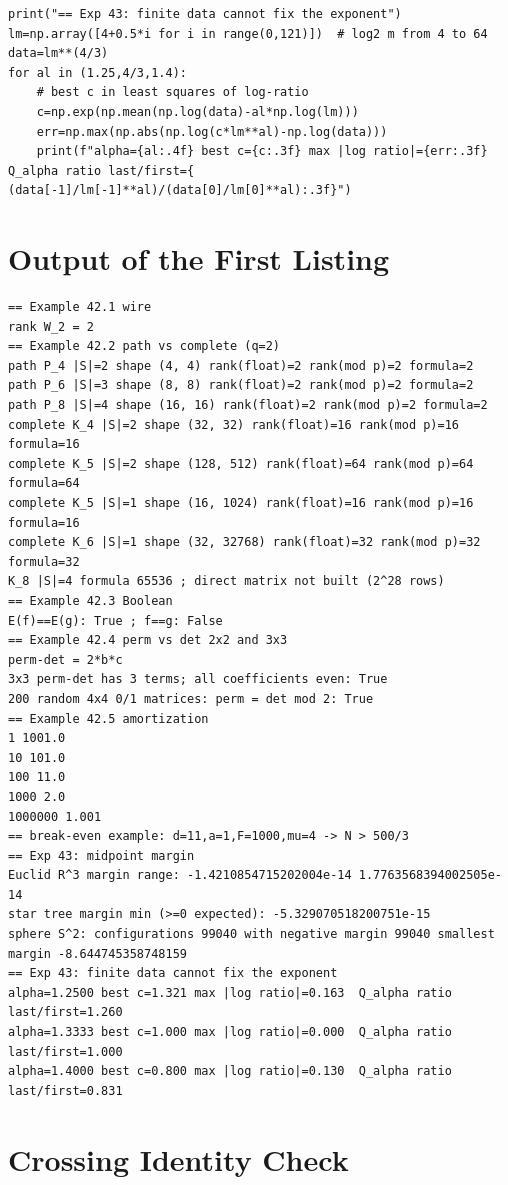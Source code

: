 \documentclass[11pt,letterpaper]{report}
\theoremstyle{plain}
\theoremstyle{definition}
\theoremstyle{remark}
\begin{document}
\begin{Verbatim}[fontsize=\scriptsize,breaklines=true,breakanywhere=true,frame=single]
print("== Exp 43: finite data cannot fix the exponent")
lm=np.array([4+0.5*i for i in range(0,121)])  # log2 m from 4 to 64
data=lm**(4/3)
for al in (1.25,4/3,1.4):
    # best c in least squares of log-ratio
    c=np.exp(np.mean(np.log(data)-al*np.log(lm)))
    err=np.max(np.abs(np.log(c*lm**al)-np.log(data)))
    print(f"alpha={al:.4f} best c={c:.3f} max |log ratio|={err:.3f}  Q_alpha ratio last/first={ (data[-1]/lm[-1]**al)/(data[0]/lm[0]**al):.3f}")
\end{Verbatim}

\section{Output of the First Listing}

\begin{Verbatim}[fontsize=\scriptsize,breaklines=true,breakanywhere=true,frame=single]
== Example 42.1 wire
rank W_2 = 2
== Example 42.2 path vs complete (q=2)
path P_4 |S|=2 shape (4, 4) rank(float)=2 rank(mod p)=2 formula=2
path P_6 |S|=3 shape (8, 8) rank(float)=2 rank(mod p)=2 formula=2
path P_8 |S|=4 shape (16, 16) rank(float)=2 rank(mod p)=2 formula=2
complete K_4 |S|=2 shape (32, 32) rank(float)=16 rank(mod p)=16 formula=16
complete K_5 |S|=2 shape (128, 512) rank(float)=64 rank(mod p)=64 formula=64
complete K_5 |S|=1 shape (16, 1024) rank(float)=16 rank(mod p)=16 formula=16
complete K_6 |S|=1 shape (32, 32768) rank(float)=32 rank(mod p)=32 formula=32
K_8 |S|=4 formula 65536 ; direct matrix not built (2^28 rows)
== Example 42.3 Boolean
E(f)==E(g): True ; f==g: False
== Example 42.4 perm vs det 2x2 and 3x3
perm-det = 2*b*c
3x3 perm-det has 3 terms; all coefficients even: True
200 random 4x4 0/1 matrices: perm = det mod 2: True
== Example 42.5 amortization
1 1001.0
10 101.0
100 11.0
1000 2.0
1000000 1.001
== break-even example: d=11,a=1,F=1000,mu=4 -> N > 500/3
== Exp 43: midpoint margin
Euclid R^3 margin range: -1.4210854715202004e-14 1.7763568394002505e-14
star tree margin min (>=0 expected): -5.329070518200751e-15
sphere S^2: configurations 99040 with negative margin 99040 smallest margin -8.644745358748159
== Exp 43: finite data cannot fix the exponent
alpha=1.2500 best c=1.321 max |log ratio|=0.163  Q_alpha ratio last/first=1.260
alpha=1.3333 best c=1.000 max |log ratio|=0.000  Q_alpha ratio last/first=1.000
alpha=1.4000 best c=0.800 max |log ratio|=0.130  Q_alpha ratio last/first=0.831
\end{Verbatim}

\section{Crossing Identity Check}
\end{document}

